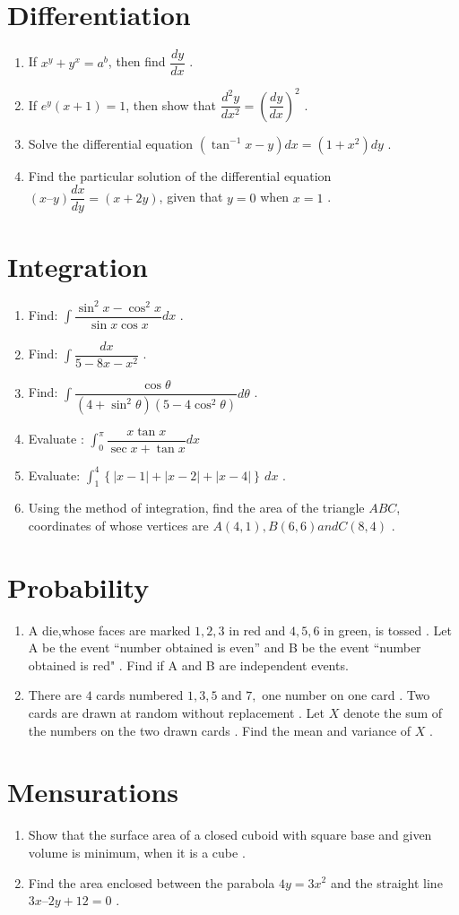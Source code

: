 \documentclass{article}
\providecommand{\brak}[1]{\ensuremath{\left(#1\right)}}
\begin{document}
\section{Differentiation}
\begin{enumerate}
\item If $x^y+y^x=a^b$, then find $\dfrac{dy}{dx}$ .
\item If $e^y\brak{x+1}=1$, then show that $\dfrac{d^2y}{dx^2}=\brak{\dfrac{dy}{dx}}^2$ .
\item Solve the differential equation $\brak{\tan^{-1}x-y}dx =\brak{1+x^2}dy$ .
\item Find the particular solution of the differential equation $\brak{x – y}\dfrac {dx}{dy} = \brak{x + 2y}$, given that $y = 0$ when $x = 1$ .

\end{enumerate}
\section{Integration}
\begin{enumerate}
\item Find: $\int \dfrac{\sin^2 x-\cos^2 x}{\sin x \cos x}dx$ .
\item Find: $\int\dfrac{dx}{5-8x-x^2}$ .
\item Find: $\int\dfrac{\cos \theta}{\brak{4+ \sin^2 \theta}\brak{5-4\cos^2 \theta}} d\theta$ .
\item Evaluate : $\int_{0}^{\pi}\dfrac{x\tan x}{\sec x+\tan x}dx$
 \item Evaluate: $\int_{1}^{4} \left\{ |x-1| + |x-2| + |x-4| \right\} \,dx$ .
 \item Using the method of integration, find the area of the triangle $ABC$, coordinates of whose vertices are $A\brak{4, 1}, B\brak{6, 6} and C\brak{8, 4}$ .
\end{enumerate}
\section{Probability}
\begin{enumerate}
\item A die,whose faces are marked  $1, 2, 3 $ in red and $4,5,6 $ in green, is tossed . Let A be the event “number obtained is even” and B be the event “number obtained is red" . Find if A and B are independent events.
\item There are $4$ cards numbered $1, 3, 5 \text{ and }  7,$  one number on one card . Two cards are drawn at random without replacement . Let $X$ denote the sum of the numbers on the two drawn cards . Find the mean and variance of $X$ .
\end{enumerate}

\section{Mensurations}
\begin{enumerate}
\item Show that the surface area of a closed cuboid with square base and given volume is minimum, when it is a cube .
\item Find the area enclosed between the parabola $4y = 3x^2$ and the straight line $3x – 2y + 12 = 0$ .
\end{enumerate}
\end{document}
